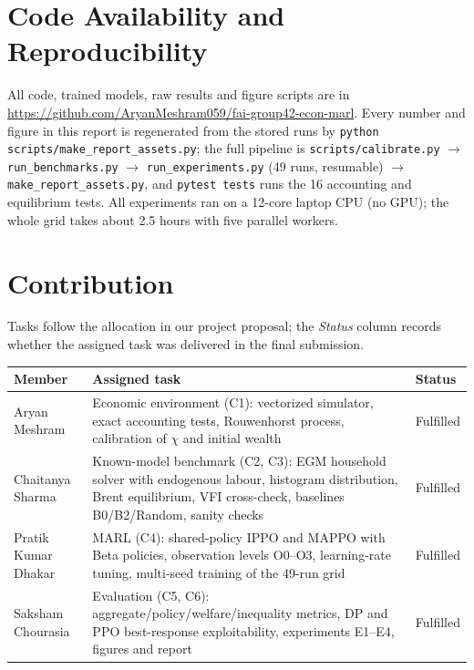 \section{Code Availability and Reproducibility}\label{sec:repo}
All code, trained models, raw results and figure scripts are in
\url{https://github.com/AryanMeshram059/fai-group42-econ-marl}. Every number and figure in this report is
regenerated from the stored runs by \texttt{python scripts/make\_report\_assets.py}; the full pipeline is
\texttt{scripts/calibrate.py} $\rightarrow$ \texttt{run\_benchmarks.py} $\rightarrow$ \texttt{run\_experiments.py}
(49 runs, resumable) $\rightarrow$ \texttt{make\_report\_assets.py}, and \texttt{pytest tests} runs the 16 accounting
and equilibrium tests. All experiments ran on a 12-core laptop CPU (no GPU); the whole grid takes about 2.5 hours
with five parallel workers.

\section{Contribution}
Tasks follow the allocation in our project proposal; the \emph{Status} column records whether the assigned task was
delivered in the final submission.

\begin{table}[h]
\centering\small
\begin{tabular}{@{}p{3.1cm}p{9.6cm}l@{}}
\toprule
Member & Assigned task & Status\\
\midrule
Aryan Meshram & Economic environment (C1): vectorized simulator, exact accounting tests, Rouwenhorst process,
calibration of $\chi$ and initial wealth & Fulfilled\\
Chaitanya Sharma & Known-model benchmark (C2, C3): EGM household solver with endogenous labour, histogram distribution,
Brent equilibrium, VFI cross-check, baselines B0/B2/Random, sanity checks & Fulfilled\\
Pratik Kumar Dhakar & MARL (C4): shared-policy IPPO and MAPPO with Beta policies, observation levels O0--O3,
learning-rate tuning, multi-seed training of the 49-run grid & Fulfilled\\
Saksham Chourasia & Evaluation (C5, C6): aggregate/policy/welfare/inequality metrics, DP and PPO best-response
exploitability, experiments E1--E4, figures and report & Fulfilled\\
\bottomrule
\end{tabular}
\end{table}
